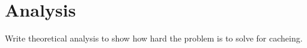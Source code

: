 \section{Analysis}\label{sec:analysis}

Write theoretical analysis to show how hard the problem is to solve for \spath cacheing.